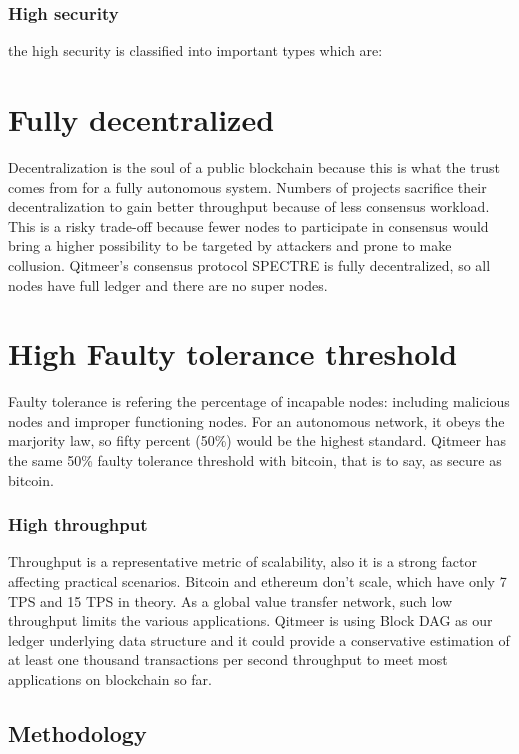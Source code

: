 \documentclass[a4paper,11pt]{article}
\begin{document}
\subsubsection{High security}
the high security is classified into important types which are:

\section*{Fully decentralized}

Decentralization is the soul of a public blockchain because this is what the trust comes from for a fully autonomous system. Numbers of projects sacrifice their decentralization to gain better throughput because of less consensus workload. This is a risky trade-off because fewer nodes to participate in consensus would bring a higher possibility to be targeted by attackers and prone to make collusion. Qitmeer's consensus protocol SPECTRE is fully decentralized, so all nodes have full ledger and there are no super nodes.

\section*{High Faulty tolerance threshold}

Faulty tolerance is refering the percentage of incapable nodes: including malicious nodes and improper functioning nodes. For an autonomous network, it obeys the marjority law, so fifty percent (50\%) would be the highest standard. Qitmeer has the same 50\% faulty tolerance threshold with bitcoin, that is to say, as secure as bitcoin.

\subsubsection{High throughput}

Throughput is a representative metric of scalability, also it is a strong factor affecting practical scenarios. Bitcoin and ethereum don't scale, which have only 7 TPS and 15 TPS in theory. As a global value transfer network, such low throughput limits the various applications. Qitmeer is using Block DAG as our ledger underlying data structure and it could provide a conservative estimation of at least one thousand transactions per second throughput to meet most applications on blockchain so far.

\subsection{Methodology}
\end{document}
